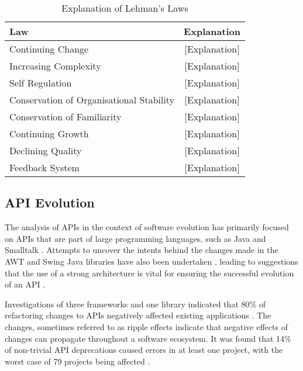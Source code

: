 \documentclass{sig-alternate}
\begin{document}
\begin{table}
       \centering
       \begin{tabular}[ht]{l|c}
              \toprule

              \textbf{Law}                              & \textbf{Explanation}    \\ \midrule
              Continuing Change                         & [Explanation]                      \\ \hline
              Increasing Complexity                     & [Explanation]                     \\ \hline
              Self Regulation                           & [Explanation]                      \\ \hline
              Conservation of Organisational Stability  & [Explanation]                     \\ \hline
              Conservation of Familiarity               & [Explanation]                      \\ \hline
              Continuing Growth                         & [Explanation]                      \\ \hline
              Declining Quality                         & [Explanation]                     \\ \hline
              Feedback System                           & [Explanation]                      \\ 

              \bottomrule

       \end{tabular}
       \caption{Explanation of Lehman's Laws}
       \label{table:expl_laws}
\end{table}


\subsection{API Evolution} \label{related_work}
The analysis of APIs in the context of software evolution has primarily focused on APIs that are part of large programming languages, such as Java \cite{hou2011exploring, shi2011empirical} and Smalltalk \cite{robbes2012developers}. Attempts to uncover the intents behind the changes made in the AWT and Swing Java libraries have also been undertaken \cite{hou2011exploring}, leading to suggestions that the use of a strong architecture is vital for ensuring the successful evolution of an API \cite{hou2011exploring}.

Investigations of three frameworks and one library indicated that 80\% of refactoring changes to APIs negatively affected existing applications \cite{dig2005role}. The changes, sometimes referred to as ripple effects \cite{robbes2012developers} indicate that negative effects of changes can propagate throughout a software ecosystem. It was found that 14\% of non-trivial API deprecations caused errors in at least one project, with the worst case of 79 projects being affected \cite{robbes2012developers}.
\end{document}
